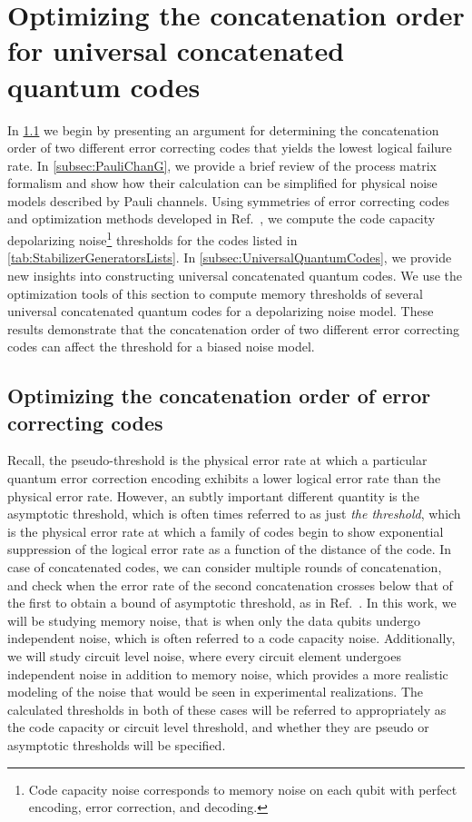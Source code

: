\documentclass[pra,longbibliography,twocolumn,showpacs,nofootinbib,superscriptaddress,notitlepage]{revtex4-1}
\begin{document}
\section{Optimizing the concatenation order for universal concatenated quantum codes}
\label{sec:ConcatOrder}

In \cref{subsec:OptimizeConcat} we begin by presenting an argument for determining the concatenation order of two different error correcting codes that yields the lowest logical failure rate. In \cref{subsec:PauliChanG}, we provide a brief review of the process matrix formalism and show how their calculation can be simplified for physical noise models described by Pauli channels. Using symmetries of error correcting codes and optimization methods developed in Ref.~\cite{CWBL16}, we compute the code capacity depolarizing noise\footnote{Code capacity noise corresponds to memory noise on each qubit with perfect encoding, error correction, and decoding.} thresholds for the codes listed in \cref{tab:StabilizerGeneratorsLists}. In \cref{subsec:UniversalQuantumCodes}, we provide new insights into constructing universal concatenated quantum codes. We use the optimization tools of this section to compute memory thresholds of several universal concatenated quantum codes for a depolarizing noise model. These results demonstrate that the concatenation order of two different error correcting codes can affect the threshold for a biased noise model.

\subsection{Optimizing the concatenation order of error correcting codes}
\label{subsec:OptimizeConcat}

Recall, the pseudo-threshold is the physical error rate at which a particular quantum error correction encoding exhibits a lower logical error rate than the physical error rate. However, an subtly important different quantity is the asymptotic threshold, which is often times referred to as just \textit{the threshold}, which is the physical error rate at which a family of codes begin to show exponential suppression of the logical error rate as a function of the distance of the code. In case of concatenated codes, we can consider multiple rounds of concatenation, and check when the error rate of the second concatenation crosses below that of the first to obtain a bound of asymptotic threshold, as in Ref.~\cite{CJL16}. In this work, we will be studying memory noise, that is when only the data qubits undergo independent noise, which is often referred to a code capacity noise. Additionally, we will study circuit level noise, where every circuit element undergoes independent noise in addition to memory noise, which provides a more realistic modeling of the noise that would be seen in experimental realizations. The calculated thresholds in both of these cases will be referred to appropriately as the code capacity or circuit level threshold, and whether they are pseudo or asymptotic thresholds will be specified.
\end{document}
